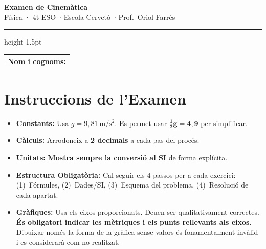 \documentclass[12pt,a4paper,twoside]{article}
\newcounter{exercici}
\begin{document}
\begin{center}
  \vspace*{-15pt}
  {\Huge\bfseries Examen de Cinemàtica}\\[8pt]
  {\Large Física · 4t ESO \quad·\quad Escola Cervetó \quad·\quad Prof.\ Oriol Farrés}\\[12pt]
  \hrule height 1.5pt
  \vspace{5pt}
\end{center}

\noindent
\begin{tabularx}{\textwidth}{|X|}
  \hline
  \rule{0pt}{15pt}\textbf{\large Nom i cognoms:}\\[5pt]
  \hline
\end{tabularx}

\vspace{0.6cm}

\section*{Instruccions de l'Examen}

\begin{itemize}[leftmargin=1.5em, itemsep=4pt, parsep=0pt]
  \item \textbf{Constants:} Usa $g = 9{,}81\ \mathrm{m/s^2}$. Es permet usar $\mathbf{\frac{1}{2} g = 4{,}9}$ per simplificar.
  \item \textbf{Càlculs:} Arrodoneix a \textbf{2 decimals} a cada pas del procés.
  \item \textbf{Unitats:} \textbf{Mostra sempre la conversió al SI} de forma explícita.
  \item \textbf{Estructura Obligatòria:} Cal seguir els 4 passos per a cada exercici: (1)~Fórmules, (2)~Dades/SI, (3)~Esquema del problema, (4)~Resolució de cada apartat.
  \item \textbf{Gràfiques:} Usa els eixos proporcionats. Deuen ser qualitativament correctes. \textbf{És obligatori indicar les mètriques i els punts rellevants als eixos}. Dibuixar només la forma de la gràfica sense valors és fonamentalment invàlid i es considerarà com no realitzat.
\end{itemize}

\vspace{0.3cm}
\end{document}
